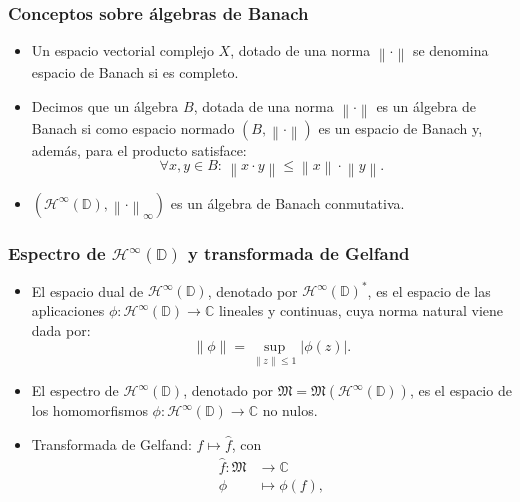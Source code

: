\documentclass[spanish, a4paper, 12pt, final, slideColor, nototal, colorBG, pdf, noaccumulate, darkblue]{beamer}
\providecommand{\abs}[1]{\left\lvert#1\right\rvert}
\providecommand{\norm}[1]{\left\lVert#1\right\rVert}
\providecommand{\norminf}[1]{\norm{#1}_{\infty}}
\providecommand{\bholomorphic}[1]{\mathcal{H}^{\infty}(#1)}
\newcommand{\complex}{\mathbb{C}}
\newcommand{\disk}{\mathbb{D}}
\newcommand{\fiber}{\mathfrak{M}}
\begin{document}
\begin{frame}
    \frametitle{Conceptos sobre álgebras de Banach}
    \begin{itemize}
        \item Un espacio vectorial complejo $X$, dotado de una norma $\norm{\cdot}$ se denomina espacio de Banach si es completo.

        \item Decimos que un álgebra $B$, dotada de una norma $\norm{\cdot}$ es un álgebra de Banach si como espacio normado $(B, \norm{\cdot})$ es un espacio de Banach y, además, para el producto satisface:
            \begin{equation*}
                \forall x, y \in B: \, \norm{x \cdot y} \leq \norm{x} \cdot \norm{y}.
            \end{equation*}

        \item $(\bholomorphic{\disk}, \norminf{\cdot})$ es un álgebra de Banach conmutativa.
    \end{itemize}
\end{frame}

\begin{frame}
    \frametitle{Espectro de $\bholomorphic{\disk}$ y transformada de Gelfand}
    \begin{itemize}
        \item El espacio dual de $\bholomorphic{\disk}$, denotado por $\bholomorphic{\disk}^*$, es el espacio de las aplicaciones $\phi: \bholomorphic{\disk} \to \complex$ lineales y continuas, cuya norma natural viene dada por:
            \begin{equation*}
                \norm{\phi} = \sup_{\norm{z} \leq 1} \abs{\phi(z)}.
            \end{equation*}

        \item El espectro de $\bholomorphic{\disk}$, denotado por $\fiber = \fiber (\bholomorphic{\disk})$, es el espacio de los homomorfismos $\phi: \bholomorphic{\disk} \to \complex$ no nulos.

        \item Transformada de Gelfand: $f \mapsto \widehat f$, con
            \begin{equation*}
                \begin{split}
                    \widehat f:  \fiber  & \to  \complex \\
                                 \phi \, & \mapsto  \phi (f),
                \end{split}
            \end{equation*}
    \end{itemize}
\end{frame}
\end{document}
